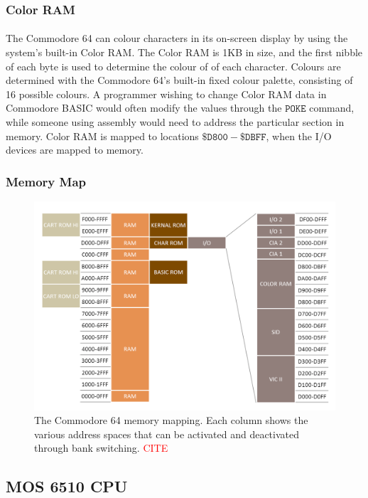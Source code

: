 \documentclass{article}
\begin{document}
\subsubsection{Color RAM}
\paragraph{}
The Commodore 64 can colour characters in its on-screen display by using the system's built-in Color RAM. The Color RAM is 1KB in size, and the first nibble of each byte is used to determine the colour of of each character. Colours are determined with the Commodore 64's built-in fixed colour palette, consisting of 16 possible colours. A programmer wishing to change Color RAM data in Commodore BASIC would often modify the values through the $\mathtt{POKE}$ command, while someone using assembly would need to address the particular section in memory. Color RAM is mapped to locations $\mathtt{\$D800 - \$DBFF}$, when the I/O devices are mapped to memory.

\subsubsection{Memory Map}
\begin{figure}[h!]
  \centering
    \includegraphics[width=\textwidth]{memmap}
  \caption{The Commodore 64 memory mapping. Each column shows the various address spaces that can be activated and deactivated through bank switching. \textcolor{red}{CITE}}
\end{figure}

\subsection{MOS 6510 CPU}
\end{document}
